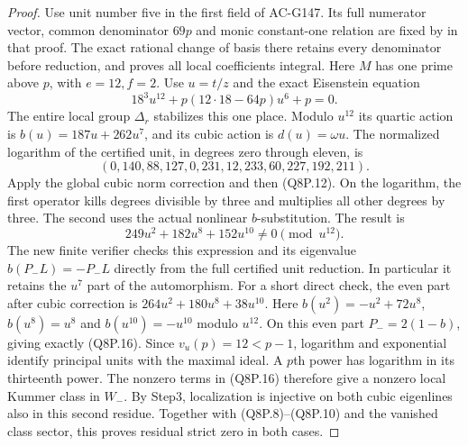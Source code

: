 \begin{proof}
Use unit number five in the first field of AC-G147.
Its full numerator vector, common denominator $69p$ and monic
constant-one relation are fixed by
 in that proof.
The exact rational change of basis there retains every denominator
before reduction, and proves all local coefficients integral.
Here $M$ has one prime above $p$, with $e=12,f=2$.
Use $u=t/z$ and the exact Eisenstein equation
\[
                   18^3u^{12}+p(12\cdot18-64p)u^6+p=0.
 \tag{Q8P.14}
\]
The entire local group $\Delta_r$ stabilizes this one place.
Modulo $u^{12}$ its quartic action is
$b(u)=187u+262u^7$, and its cubic action is $d(u)=\omega u$.
The normalized logarithm of the certified unit, in degrees
zero through eleven, is
\[
                 (0,140,88,127,0,231,12,233,60,227,192,211).
 \tag{Q8P.15}
\]
Apply the global cubic norm correction and then (Q8P.12).
On the logarithm, the first operator kills degrees divisible by
three and multiplies all other degrees by three.
The second uses the actual nonlinear $b$-substitution.
The result is
\[
                     249u^2+182u^8+152u^{10}\ne0
                         \pmod{u^{12}}.
 \tag{Q8P.16}
\]
The new finite verifier checks this expression and its eigenvalue
$b(P_-L)=-P_-L$ directly from the full certified unit reduction.
In particular it retains the $u^7$ part of the automorphism.
For a short direct check, the even part after cubic correction is
$264u^2+180u^8+38u^{10}$.
Here $b(u^2)=-u^2+72u^8$, $b(u^8)=u^8$ and
$b(u^{10})=-u^{10}$ modulo $u^{12}$.
On this even part $P_-=2(1-b)$, giving exactly (Q8P.16).
Since $v_u(p)=12<p-1$, logarithm and exponential identify
principal units with the maximal ideal.
A $p$th power has logarithm in its thirteenth power.
The nonzero terms in (Q8P.16) therefore give a nonzero local
Kummer class in $W_-$.
By Step3, localization is injective on both cubic eigenlines
also in this second residue.
Together with (Q8P.8)--(Q8P.10) and the vanished class sector,
this proves residual strict zero in both cases.


\end{proof}
